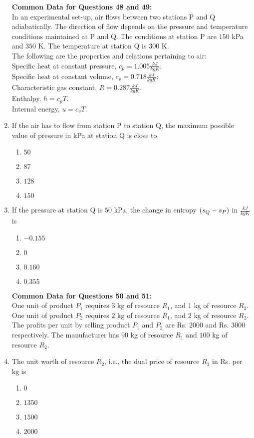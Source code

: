 \documentclass[journal,12pt,twocolumn]{IEEEtran}
\theoremstyle{remark}
\begin{document}
\begin{enumerate}[start=40]
\textbf{Common Data for Questions 48 and 49:}\\ 
In an experimental set-up, air flows between two stations P and Q adiabatically. The direction of flow depends on the pressure and temperature conditions maintained at P and Q. The conditions at station P are $150$ kPa and $350$ K. The temperature at station Q is $300$ K. \\
The following are the properties and relations pertaining to air: \\
Specific heat at constant pressure, $c_p = 1.005 \frac{ kJ}{kgK}$; \\
Specific heat at constant volume, $c_v = 0.718\frac{ kJ}{kgK}$; \\
Characteristic gas constant, $R = 0.287 \frac{kJ}{kgK}$. \\
Enthalpy, $h = c_p T$. \\
Internal energy, $u = c_v T$. 


    \item If the air has to flow from station P to station Q, the maximum possible value of pressure in kPa at station Q is close to
    \begin{enumerate}
        \item $50$
        \item $87$
        \item $128$
        \item $150$
    \end{enumerate}

    \item If the pressure at station Q is $50$ kPa, the change in entropy $\left(s_Q - s_P\right)$ in $\frac{kJ}{kgK}$ is
    \begin{enumerate}
        \item $-0.155$
        \item $0$
        \item $0.160$
        \item $0.355$
    \end{enumerate}

\textbf{Common Data for Questions 50 and 51:} \\
One unit of product $P_1$ requires $3$ kg of resource $R_1$, and $1$ kg of resource $R_2$. One unit of product $P_2$ requires $2$ kg of resource $R_1$, and $2$ kg of resource $R_2$. The profits per unit by selling product $P_1$ and $P_2$ are Rs. $2000$ and Rs. $3000$ respectively. The manufacturer has $90$ kg of resource $R_1$ and $100$ kg of resource $R_2$.

    \item The unit worth of resource $R_2$, i.e., the dual price of resource $R_2$ in Rs. per kg is
    \begin{enumerate}
        \item $0$
        \item $1350$
        \item $1500$
        \item $2000$
    \end{enumerate}


\end{enumerate}
\end{document}
